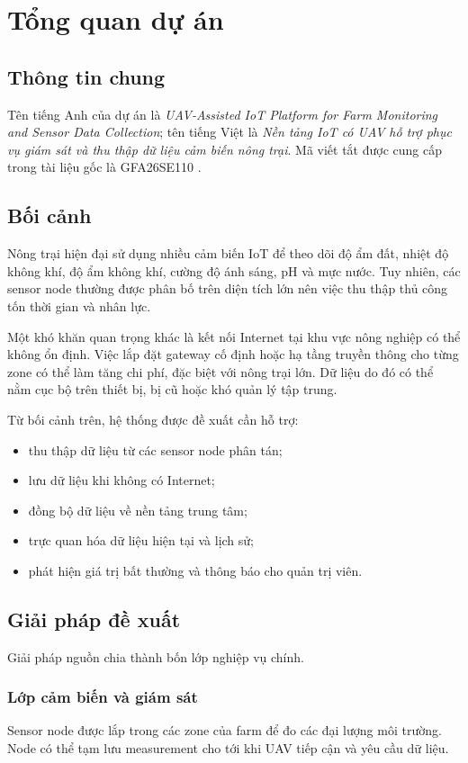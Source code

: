 
\chapter{Tổng quan dự án}

\section{Thông tin chung}
Tên tiếng Anh của dự án là \textit{UAV-Assisted IoT Platform for Farm Monitoring and Sensor Data Collection}; tên tiếng Việt là \textit{Nền tảng IoT có UAV hỗ trợ phục vụ giám sát và thu thập dữ liệu cảm biến nông trại}. Mã viết tắt được cung cấp trong tài liệu gốc là GFA26SE110 \cite{projectbrief}.

\section{Bối cảnh}
Nông trại hiện đại sử dụng nhiều cảm biến IoT để theo dõi độ ẩm đất, nhiệt độ không khí, độ ẩm không khí, cường độ ánh sáng, pH và mực nước. Tuy nhiên, các sensor node thường được phân bố trên diện tích lớn nên việc thu thập thủ công tốn thời gian và nhân lực.

Một khó khăn quan trọng khác là kết nối Internet tại khu vực nông nghiệp có thể không ổn định. Việc lắp đặt gateway cố định hoặc hạ tầng truyền thông cho từng zone có thể làm tăng chi phí, đặc biệt với nông trại lớn. Dữ liệu do đó có thể nằm cục bộ trên thiết bị, bị cũ hoặc khó quản lý tập trung.

Từ bối cảnh trên, hệ thống được đề xuất cần hỗ trợ:
\begin{itemize}
  \item thu thập dữ liệu từ các sensor node phân tán;
  \item lưu dữ liệu khi không có Internet;
  \item đồng bộ dữ liệu về nền tảng trung tâm;
  \item trực quan hóa dữ liệu hiện tại và lịch sử;
  \item phát hiện giá trị bất thường và thông báo cho quản trị viên.
\end{itemize}

\section{Giải pháp đề xuất}
Giải pháp nguồn chia thành bốn lớp nghiệp vụ chính.

\subsection{Lớp cảm biến và giám sát}
Sensor node được lắp trong các zone của farm để đo các đại lượng môi trường. Node có thể tạm lưu measurement cho tới khi UAV tiếp cận và yêu cầu dữ liệu.

